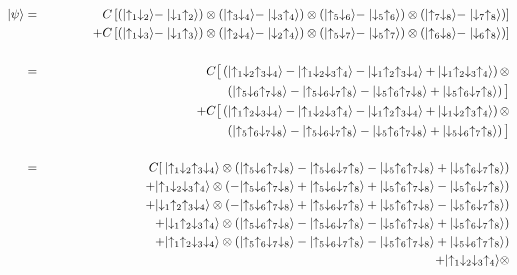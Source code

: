 \begin{eqnarray*}
 \ket{\psi}  &=& C\left[\singlet{1}{2} \ox \singlet{3}{4} \ox \singlet{5}{6} \ox \singlet{7}{8}\right]  \\
	   &&    \quad   + C\left[\singlet{1}{3} \ox \singlet{2}{4} \ox \singlet{5}{7} \ox \singlet{6}{8}\right]  \\ 	
	    \\
	     &=& C\big[\left(\ket{\up_1\dw_2\up_3\dw_4} - \ket{\up_1\dw_2\dw_3\up_4} -
	              \ket{\dw_1\up_2\up_3\dw_4} + \ket{\dw_1\up_2\dw_3\up_4}\right) \ox \\
	        && \hspace{2in}
	               \left(\ket{\up_5\dw_6\up_7\dw_8} - \ket{\up_5\dw_6\dw_7\up_8} -
	              \ket{\dw_5\up_6\up_7\dw_8} + \ket{\dw_5\up_6\dw_7\up_8}\right)\big]  \\
	     &&  \quad + C\big[\left(\ket{\up_1\up_2\dw_3\dw_4} - \ket{\up_1\dw_2\dw_3\up_4} -
	              \ket{\dw_1\up_2\up_3\dw_4} + \ket{\dw_1\dw_2\up_3\up_4}\right) \ox  \\
	               && \hspace{2in}
	              \left(\ket{\up_5\up_6\dw_7\dw_8} - \ket{\up_5\dw_6\dw_7\up_8} -
	              \ket{\dw_5\up_6\up_7\dw_8} + \ket{\dw_5\dw_6\up_7\up_8}\right)\big] \\
	     \\
	     	&=& C[ \: \ket{\up_1\dw_2\up_3\dw_4} \ox 
	     		\left(\ket{\up_5\dw_6\up_7\dw_8} - \ket{\up_5\dw_6\dw_7\up_8} -
	              	\ket{\dw_5\up_6\up_7\dw_8} + \ket{\dw_5\up_6\dw_7\up_8}\right)  \\
		&& \: + \ket{\up_1\dw_2\dw_3\up_4} \ox
			\left(-\ket{\up_5\dw_6\up_7\dw_8} + \ket{\up_5\dw_6\dw_7\up_8} +
	              	\ket{\dw_5\up_6\up_7\dw_8} - \ket{\dw_5\up_6\dw_7\up_8}\right)  \\
		&& \: + \ket{\dw_1\up_2\up_3\dw_4} \ox
			\left(-\ket{\up_5\dw_6\up_7\dw_8} + \ket{\up_5\dw_6\dw_7\up_8} +
	              	\ket{\dw_5\up_6\up_7\dw_8} - \ket{\dw_5\up_6\dw_7\up_8}\right)  \\
		&& \: + \ket{\dw_1\up_2\dw_3\up_4} \ox
			\left(\ket{\up_5\dw_6\up_7\dw_8} - \ket{\up_5\dw_6\dw_7\up_8} -
			\ket{\dw_5\up_6\up_7\dw_8} + \ket{\dw_5\up_6\dw_7\up_8}\right) \\
		&& \: + \ket{\up_1\up_2\dw_3\dw_4} \ox
			\left(\ket{\up_5\up_6\dw_7\dw_8} - \ket{\up_5\dw_6\dw_7\up_8} -
			\ket{\dw_5\up_6\up_7\dw_8} + \ket{\dw_5\dw_6\up_7\up_8}\right) \\
		&& \: + \ket{\up_1\dw_2\dw_3\up_4} \ox

\end{eqnarray*}
